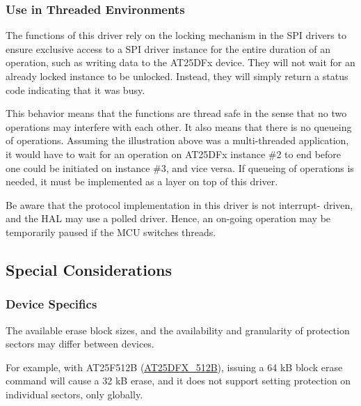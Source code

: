 \label{group__asfdoc__common2__at25dfx__group_asfdoc_sam0_at25dfx_example}%
%
\hypertarget{group__asfdoc__common2__at25dfx__group_asfdoc_common2_at25dfx_module_threads}{}\subsubsection{Use in Threaded Environments}\label{group__asfdoc__common2__at25dfx__group_asfdoc_common2_at25dfx_module_threads}
The functions of this driver rely on the locking mechanism in the S\+PI drivers to ensure exclusive access to a S\+PI driver instance for the entire duration of an operation, such as writing data to the A\+T25\+D\+Fx device. They will not wait for an already locked instance to be unlocked. Instead, they will simply return a status code indicating that it was busy.

This behavior means that the functions are thread safe in the sense that no two operations may interfere with each other. It also means that there is no queueing of operations. Assuming the illustration above was a multi-\/threaded application, it would have to wait for an operation on A\+T25\+D\+Fx instance \#2 to end before one could be initiated on instance \#3, and vice versa. If queueing of operations is needed, it must be implemented as a layer on top of this driver.

Be aware that the protocol implementation in this driver is not interrupt-\/ driven, and the H\+AL may use a polled driver. Hence, an on-\/going operation may be temporarily paused if the M\+CU switches threads.\hypertarget{group__asfdoc__common2__at25dfx__group_asfdoc_common2_at25dfx_special_considerations}{}\subsection{Special Considerations}\label{group__asfdoc__common2__at25dfx__group_asfdoc_common2_at25dfx_special_considerations}
\hypertarget{group__asfdoc__common2__at25dfx__group_asfdoc_common2_at25dfx_special_dev}{}\subsubsection{Device Specifics}\label{group__asfdoc__common2__at25dfx__group_asfdoc_common2_at25dfx_special_dev}
The available erase block sizes, and the availability and granularity of protection sectors may differ between devices.

For example, with A\+T25\+F512B (\mbox{\hyperlink{group__asfdoc__common2__at25dfx__group_gga98ba30dd90f741beb7f8d47e7725471dabbf1e1dd637f606098ae4ccac417ab14}{A\+T25\+D\+F\+X\+\_\+512B}}), issuing a 64 kB block erase command will cause a 32 kB erase, and it does not support setting protection on individual sectors, only globally.

